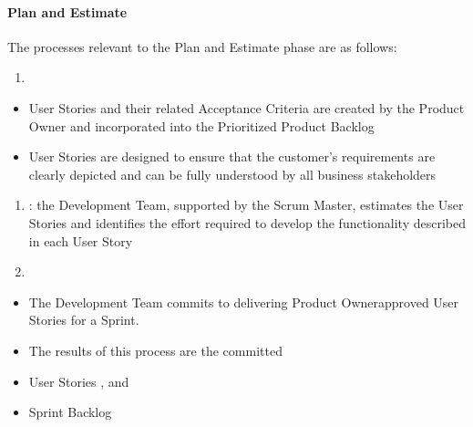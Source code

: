 \documentclass[letterpaper,10pt,english]{jupyterBook}
\begin{document}
\paragraph{Plan and Estimate}
\label{\detokenize{APM/sbok:plan-and-estimate}}
\sphinxAtStartPar
The processes relevant to the Plan and Estimate phase are as follows:
\begin{enumerate}
%
\item {} 
\sphinxAtStartPar
{}

\end{enumerate}
\begin{itemize}
\item {} 
\sphinxAtStartPar
User Stories and their related Acceptance Criteria are created by the Product Owner and incorporated into the Prioritized Product Backlog

\item {} 
\sphinxAtStartPar
User Stories are designed to ensure that the customer’s requirements are clearly depicted and can be fully understood by all business stakeholders

\end{itemize}
\begin{enumerate}
%
\setcounter{enumi}{1}
\item {} 
\sphinxAtStartPar
{}: the Development Team, supported by the Scrum Master, estimates the User Stories and identifies the effort required to develop the functionality described in each User Story

\item {} 
\sphinxAtStartPar
{}

\end{enumerate}
\begin{itemize}
\item {} 
\sphinxAtStartPar
The Development Team commits to delivering Product Owner\sphinxhyphen{}approved User Stories for a Sprint.

\item {} 
\sphinxAtStartPar
The results of this process are the committed

\item {} 
\sphinxAtStartPar
User Stories , and

\item {} 
\sphinxAtStartPar
Sprint Backlog

\end{itemize}
\end{document}
